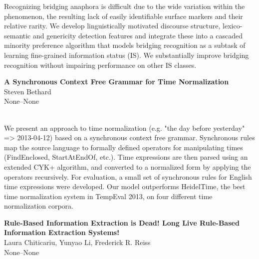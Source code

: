 \documentclass[twoside,makeidx]{book}
\renewcommand{\normalsize}{\fontsize{8}{9}\selectfont}
\renewcommand{\small}{\fontsize{7}{8}\selectfont}
\begin{document}
\nopagebreak%
\noindent%
{\small Recognizing bridging anaphora is difficult due to the wide variation   within the phenomenon, the resulting lack of easily identifiable   surface markers and their relative rarity. We develop linguistically   motivated discourse structure, lexico-semantic and genericity   detection features and integrate these into a cascaded minority   preference algorithm that models bridging recognition as a subtask   of learning fine-grained information status (IS).  We substantially   improve bridging recognition without impairing performance on other   IS classes.}
\par\vspace{2em}\noindent%
\begin{minipage}{\linewidth}%
\begin{center}
\textbf{\normalsize A Synchronous Context Free Grammar for Time Normalization}\\
\normalsize  Steven Bethard\\
{\small None--None}\\
\end{center}
\end{minipage}\\[0.5em]
\nopagebreak%
\noindent%
{\small We present an approach to time normalization (e.g. "the day before yesterday" => 2013-04-12) based on a synchronous context free grammar. Synchronous rules map the source language to formally defined operators for manipulating times (FindEnclosed, StartAtEndOf, etc.). Time expressions are then parsed using an extended CYK+ algorithm, and converted to a normalized form by applying the operators recursively. For evaluation, a small set of synchronous rules for English time expressions were developed. Our model outperforms HeidelTime, the best time normalization system in TempEval 2013, on four different time normalization corpora.}
\par\vspace{2em}\noindent%
\begin{minipage}{\linewidth}%
\begin{center}
\textbf{\normalsize Rule-Based Information Extraction is Dead! Long Live Rule-Based Information Extraction Systems!}\\
\normalsize  Laura Chiticariu,  Yunyao Li,  Frederick R. Reiss\\
{\small None--None}\\
\end{center}
\end{minipage}\\[0.5em]
\end{document}
